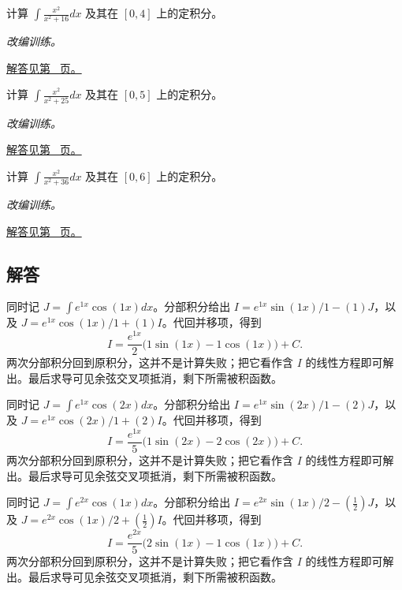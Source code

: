 \documentclass[UTF8,12pt,a4paper,fontset=fandol]{ctexart}
\begin{document}
\begin{example}[先拆分再积分的有理式]\label{ex:c15q22}
计算 $\displaystyle\int\frac{x^2}{x^2+16}dx$ 及其在 $[0,4]$ 上的定积分。
\par\textit{改编训练。}\par\hyperref[ans:c15q22]{解答见第~\pageref{ans:c15q22} 页。}
\end{example}
\begin{example}[先拆分再积分的有理式]\label{ex:c15q23}
计算 $\displaystyle\int\frac{x^2}{x^2+25}dx$ 及其在 $[0,5]$ 上的定积分。
\par\textit{改编训练。}\par\hyperref[ans:c15q23]{解答见第~\pageref{ans:c15q23} 页。}
\end{example}
\begin{example}[先拆分再积分的有理式]\label{ex:c15q24}
计算 $\displaystyle\int\frac{x^2}{x^2+36}dx$ 及其在 $[0,6]$ 上的定积分。
\par\textit{改编训练。}\par\hyperref[ans:c15q24]{解答见第~\pageref{ans:c15q24} 页。}
\end{example}
\subsection{解答}
\begin{solve}\label{ans:c15q1}
同时记 $J=\int e^{1x}\cos(1x)dx$。分部积分给出 $I=e^{1x}\sin(1x)/1-(1)J$，以及 $J=e^{1x}\cos(1x)/1+(1)I$。代回并移项，得到
\[
I=\frac{e^{1x}}{2}\bigl(1\sin(1x)-1\cos(1x)\bigr)+C.
\]
两次分部积分回到原积分，这并不是计算失败；把它看作含 $I$ 的线性方程即可解出。最后求导可见余弦交叉项抵消，剩下所需被积函数。
\end{solve}

\begin{solve}\label{ans:c15q2}
同时记 $J=\int e^{1x}\cos(2x)dx$。分部积分给出 $I=e^{1x}\sin(2x)/1-(2)J$，以及 $J=e^{1x}\cos(2x)/1+(2)I$。代回并移项，得到
\[
I=\frac{e^{1x}}{5}\bigl(1\sin(2x)-2\cos(2x)\bigr)+C.
\]
两次分部积分回到原积分，这并不是计算失败；把它看作含 $I$ 的线性方程即可解出。最后求导可见余弦交叉项抵消，剩下所需被积函数。
\end{solve}

\begin{solve}\label{ans:c15q3}
同时记 $J=\int e^{2x}\cos(1x)dx$。分部积分给出 $I=e^{2x}\sin(1x)/2-(\frac{1}{2})J$，以及 $J=e^{2x}\cos(1x)/2+(\frac{1}{2})I$。代回并移项，得到
\[
I=\frac{e^{2x}}{5}\bigl(2\sin(1x)-1\cos(1x)\bigr)+C.
\]
两次分部积分回到原积分，这并不是计算失败；把它看作含 $I$ 的线性方程即可解出。最后求导可见余弦交叉项抵消，剩下所需被积函数。
\end{solve}
\end{document}
